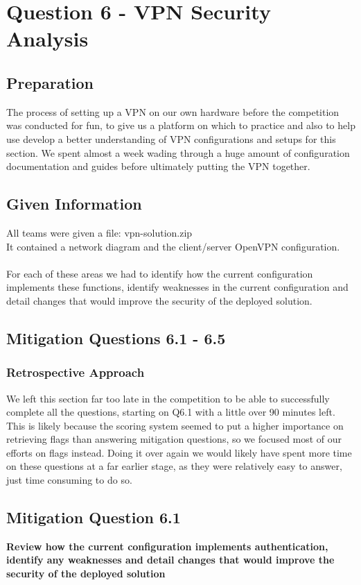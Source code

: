 \chapter{Question 6 - VPN Security Analysis}

\section{Preparation}
The process of setting up a VPN on our own hardware before the competition was
conducted for fun, to give us a platform on which to practice and also to help
use develop a better understanding of VPN configurations and setups for this
section. We spent almost a week wading through a huge amount of configuration
documentation and guides before ultimately putting the VPN together. 

\section{Given Information}
All teams were given a file: vpn-solution.zip\\
It contained a network diagram and the client/server OpenVPN configuration.
\\\\
For each of these areas we had to identify how the current configuration
implements these functions, identify weaknesses in the current configuration and
detail changes that would improve the security of the deployed solution.

\section{Mitigation Questions 6.1 - 6.5}
\subsection{Retrospective Approach}
We left this section far too late in the competition to be able to successfully
complete all the questions, starting on Q6.1 with a little over 90 minutes left.
This is likely because the scoring system seemed to put a higher importance on
retrieving flags than answering mitigation questions, so we focused most of our
efforts on flags instead. Doing it over again we would likely have spent more
time on these questions at a far earlier stage, as they were relatively easy to
answer, just time consuming to do so.

\section{Mitigation Question 6.1}
\textbf{Review how the current configuration implements authentication, identify
any weaknesses and detail changes that would improve the security of the
deployed solution}
